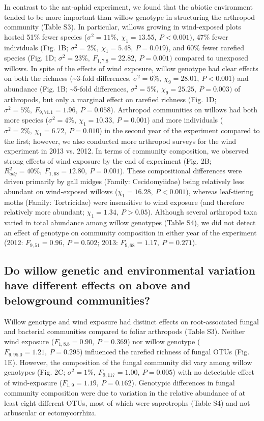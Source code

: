 \documentclass[11pt]{article}
\begin{document}
In contrast to the ant-aphid experiment, we found that the abiotic
environment tended to be more important than willow genotype in
structuring the arthropod community (Table S3). In particular, willows
growing in wind-exposed plots hosted 51\% fewer species
(\(\sigma^2=11\%,\ \chi_1=13.55,\ P<0.001)\), 47\% fewer individuals (Fig. 1B; \(\sigma^2=2\%,\ \chi_1=5.48,\ P=0.019)\),
and 60\% fewer rarefied species (Fig. 1D; \(\sigma^2=23\%,\ F_{1,7.8}=22.82,\ P=0.001)\) compared to
unexposed willows. In spite of the effects of wind exposure, willow
genotype had clear effects on both the richness (\textasciitilde{}3-fold
differences, \(\sigma^2=6\%,\ \chi_9=28.01,\ P<0.001)\) and abundance (Fig. 1B;
\textasciitilde{}5-fold differences, \(\sigma^2=5\%,\ \chi_9=25.25,\ P=0.003)\) of arthropods,
but only a marginal effect on rarefied richness (Fig. 1D;
\(\sigma^2=5\%,\ F_{9,71.1}=1.96,\ P=0.058\)). Arthropod communities on willows had both more
species (\(\sigma^2=4\%,\ \chi_1=10.33,\ P=0.001\)) and more individuals (\(\sigma^2=2\%,\ \chi_1=6.72,\ P=0.010\)) in
the second year of the experiment compared to the first; however, we
also conducted more arthropod surveys for the wind experiment in 2013
vs. 2012. In terms of community composition, we observed strong effects
of wind exposure by the end of experiment (Fig. 2B; \(R_{adj}^2=40\%,\ F_{1,68}=12.80,\ P=0.001\)).
These compositional differences were driven primarily by gall midges
(Family: Cecidomyiidae) being relatively less abundant on wind-exposed
willows (\(\chi_1=16.28,\ P<0.001\)), whereas leaf-tiering moths (Family:
Tortricidae) were insensitive to wind exposure (and therefore relatively
more abundant; \(\chi_1=1.34,\ P>0.05\)). Although several arthropod taxa
varied in total abundance among willow genotypes (Table S4), we did not
detect an effect of genotype on community composition in either year of
the experiment (2012: \(F_{9,51}=0.96,\ P=0.502\); 2013: \(F_{9,68}=1.17,\ P=0.271\)).

\subsection*{Do willow genetic and environmental variation have different
effects on above and belowground
communities?}

Willow genotype and wind exposure had distinct effects on
root-associated fungal and bacterial communities compared to foliar
arthropods (Table S3). Neither wind exposure (\(F_{1,8.8}=0.90,\ P=0.369\)) nor
willow genotype (\(F_{9,95.0}=1.21,\ P=0.295\)) influenced the rarefied richness of
fungal OTUs (Fig. 1E). However, the composition of the fungal community
did vary among willow genotypes (Fig. 2C; \(\sigma^2=1\%,\ F_{9,117}=1.00,\ P=0.005\)) with no
detectable effect of wind-exposure (\(F_{1,9}=1.19,\ P=0.162\)). Genotypic
differences in fungal community composition were due to variation in the
relative abundance of at least eight different OTUs, most of which were
saprotrophs (Table S4) and not arbuscular or ectomycorrhiza.
\end{document}
